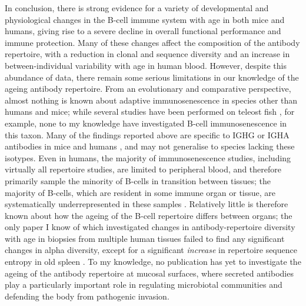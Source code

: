 In conclusion, there is strong evidence for a variety of developmental and physiological changes in the B-cell immune system with age in both mice and humans, giving rise to a severe decline in overall functional performance and immune protection. Many of these changes affect the composition of the antibody repertoire, with a reduction in clonal and sequence diversity and an increase in between-individual variability with age in human blood. However, despite this abundance of data, there remain some serious limitations in our knowledge of the ageing antibody repertoire.  From an evolutionary and comparative perspective, almost nothing is known about adaptive immunosenescence in species other than humans and mice; while several \igseq studies have been performed on teleost fish \parencite{weinstein2009igseq,jiang2011determinism,krasnov2017igseq,lund2019salmon,fu2018fugu}, for example, none to my knowledge have investigated B-cell immunosenescence in this taxon. Many of the findings reported above are specific to IGHG or IGHA antibodies in mice and humans \parencite{kogut2012bcells}, and may not generalise to species lacking these isotypes. Even in humans, the majority of immunosenescence studies, including virtually all repertoire studies, are limited to peripheral blood, and therefore primarily sample the minority of B-cells in transition between tissues; the majority of B-cells, which are resident in some immune organ or tissue, are systematically underrepresented in these samples \parencite{siegrist2009extremes,tabibiankeissar2016ageing}. Relatively little is therefore known about how the ageing of the B-cell repertoire differs between organs; the only paper I know of which investigated changes in antibody-repertoire diversity with age in biopsies from multiple human tissues failed to find any significant changes in alpha diversity, except for a significant \textit{increase} in repertoire sequence entropy in old spleen \parencite{tabibiankeissar2016ageing}. To my knowledge, no publication has yet to investigate the ageing of the antibody repertoire at mucosal surfaces, where secreted antibodies play a particularly important role in regulating microbiotal communities and defending the body from pathogenic invasion.

